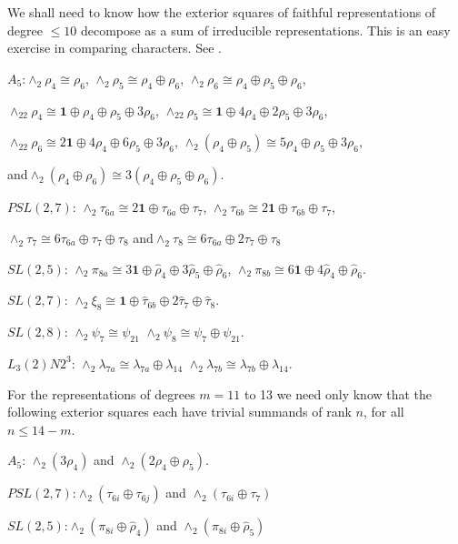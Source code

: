 \documentclass[12pt]{amsart}
\renewcommand{\leq}{\leqslant}
\begin{document}
We shall need to know how the exterior squares of faithful representations 
of degree $\leq10$ decompose as a sum of irreducible representations.
This is an easy exercise in comparing characters.  
See \cite[Chapter 2]{Se}.

\medskip
\noindent$A_5$:\quad $\wedge_2\rho_4\cong\rho_6$,
\quad$\wedge_2\rho_5\cong\rho_4\oplus\rho_6$,
\quad$\wedge_2\rho_6\cong\rho_4\oplus\rho_5\oplus\rho_6$,

$\wedge_22\rho_4\cong\mathbf{1}\oplus\rho_4\oplus\rho_5\oplus3\rho_6$,\quad
$\wedge_22\rho_5\cong\mathbf{1}\oplus4\rho_4\oplus2\rho_5\oplus3\rho_6$,

$\wedge_22\rho_6\cong2\mathbf{1}\oplus4\rho_4\oplus6\rho_5\oplus3\rho_6$,\quad
$\wedge_2(\rho_4\oplus\rho_5)\cong5\rho_4\oplus\rho_5\oplus3\rho_6$, 

{and}\quad$\wedge_2(\rho_4\oplus\rho_6)\cong3(\rho_4\oplus\rho_5\oplus\rho_6)$.

\noindent$PSL(2,7)$:\quad
$\wedge_2\tau_{6a}\cong2\mathbf{1}\oplus\tau_{6a}\oplus\tau_7$,\quad
$\wedge_2\tau_{6b}\cong2\mathbf{1}\oplus\tau_{6b}\oplus\tau_7$,

$\wedge_2\tau_7\cong6\tau_{6a}\oplus\tau_7\oplus\tau_8$\quad
{and}\quad$\wedge_2\tau_8\cong6\tau_{6a}\oplus2\tau_7\oplus\tau_8$

\noindent$SL(2,5)$:\quad
$\wedge_2\pi_{8a}\cong3\mathbf{1}\oplus\widehat\rho_4\oplus3\widehat\rho_5\oplus\widehat\rho_6$,\quad
$\wedge_2\pi_{8b}\cong6\mathbf{1}\oplus4\widehat\rho_4\oplus\widehat\rho_6$.

\noindent$SL(2,7)$:\quad
$\wedge_2\xi_8\cong\mathbf{1}\oplus\widehat\tau_{6b}\oplus
2\widehat\tau_7\oplus\widehat\tau_8$.

\noindent$SL(2,8)$:\quad
$\wedge_2\psi_7\cong\psi_{21}$\quad
$\wedge_2\psi_8\cong\psi_7\oplus\psi_{21}$.

\noindent$L_3(2)N2^3$:\quad
$\wedge_2\lambda_{7a}\cong\lambda_{7a}\oplus\lambda_{14}$
\quad $\wedge_2\lambda_{7b}\cong\lambda_{7b}\oplus\lambda_{14}$.

For the representations of degrees $m=11$ to 13 we need only know
that the following exterior squares each have trivial summands of rank $n$, 
for all $n\leq14-m$.

\noindent$A_5$:\quad 
$\wedge_2(3\rho_4)$ and $\wedge_2(2\rho_4\oplus\rho_5)$.

\noindent$PSL(2,7)$:\quad $\wedge_2(\tau_{6i}\oplus\tau_{6j})$ and 
$\wedge_2(\tau_{6i}\oplus\tau_7)$ 

\noindent$SL(2,5)$:\quad$\wedge_2(\pi_{8i}\oplus\widehat\rho_4)$ and
$\wedge_2(\pi_{8i}\oplus\widehat\rho_5)$ 
\end{document}
